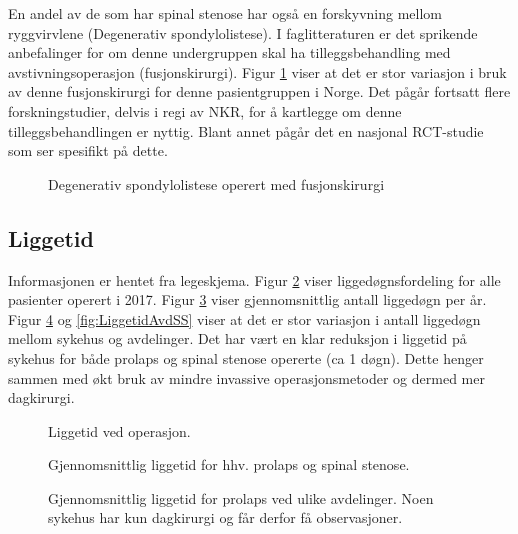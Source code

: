 \documentclass [norsk,a4paper,twoside]{article}\usepackage[]{graphicx}\usepackage[]{color}
\begin{document}
En andel av de som har spinal stenose har også en forskyvning mellom ryggvirvlene (Degenerativ spondylolistese). I faglitteraturen er det sprikende anbefalinger for om denne undergruppen skal ha tilleggsbehandling med avstivningsoperasjon (fusjonskirurgi).
Figur \ref{fig:degSponFusj} viser at det er stor variasjon i bruk av denne fusjonskirurgi 
for denne pasientgruppen i Norge. Det pågår fortsatt flere forskningstudier, delvis i regi av NKR,  
for å kartlegge om  denne tilleggsbehandlingen er nyttig. Blant annet pågår det
en nasjonal RCT-studie som ser spesifikt på dette. 



\begin{figure}[ht]
\caption{\label{fig:degSponFusj} Degenerativ spondylolistese operert med fusjonskirurgi}
\end{figure}


\clearpage

\subsection{Liggetid}

Informasjonen er hentet fra legeskjema.
Figur \ref{fig:Liggedogn} viser liggedøgnsfordeling for alle pasienter operert i 2017. Figur \ref{fig:LiggedognTid} viser gjennomsnittlig antall liggedøgn per år.  
Figur \ref{fig:LiggetidAvdPro} og \ref{fig:LiggetidAvdSS} viser at det er stor variasjon i antall liggedøgn mellom sykehus og avdelinger.
Det har vært en klar reduksjon i  liggetid på sykehus  for både prolaps og spinal stenose opererte (ca 1 døgn). Dette henger sammen med økt bruk av mindre invassive operasjonsmetoder og dermed mer dagkirurgi. 





\begin{figure}[h] 
\caption{Liggetid ved operasjon.}
\label{fig:Liggedogn}
\end{figure}

\begin{figure}[h] 
\centerline{
}
\caption{Gjennomsnittlig liggetid for hhv. prolaps og spinal stenose. }
\label{fig:LiggedognTid}
\end{figure}

\begin{figure}[h] 
\caption{Gjennomsnittlig liggetid for prolaps ved ulike avdelinger. Noen sykehus har kun dagkirurgi og får derfor få observasjoner. } 
\label{fig:LiggetidAvdPro}
\end{figure}
\end{document}
